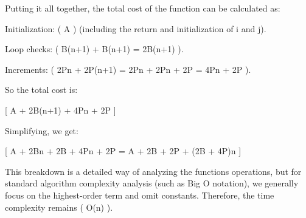 Putting it all together, the total cost of the function can be calculated as\+:


\begin{DoxyItemize}
\item Initialization\+: ( A ) (including the return and initialization of {\ttfamily i} and {\ttfamily j}).
\item Loop checks\+: ( B(n+1) + B(n+1) = 2B(n+1) ).
\item Increments\+: ( 2Pn + 2P(n+1) = 2Pn + 2Pn + 2P = 4Pn + 2P ).
\end{DoxyItemize}

So the total cost is\+:

\mbox{[} A + 2B(n+1) + 4Pn + 2P \mbox{]}

Simplifying, we get\+:

\mbox{[} A + 2Bn + 2B + 4Pn + 2P = A + 2B + 2P + (2B + 4P)n \mbox{]}

This breakdown is a detailed way of analyzing the function\textquotesingle{}s operations, but for standard algorithm complexity analysis (such as Big O notation), we generally focus on the highest-\/order term and omit constants. Therefore, the time complexity remains ( O(n) ). 